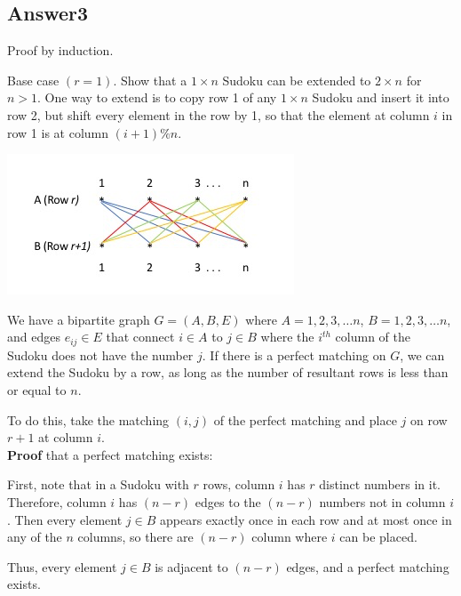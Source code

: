 \documentclass[twoside]{article}
\begin{document}
\subsection{Answer3}
Proof by induction.

Base case $(r=1)$. Show that a $1 \times n$ Sudoku can be extended to $2 \times n$ for $n > 1$.
One way to extend is to copy row 1 of any $1 \times n$ Sudoku and insert it into row 2, but shift every element in the row by 1, so that the element at column $i$ in row 1 is at column $(i + 1) \% n$. 

\includegraphics{SudokuFigure1}
 
We have a bipartite graph $G=(A, B, E)$ where $A={1, 2 , 3, \ldots n}$, $B={1, 2, 3, \ldots n}$, and edges $e_{ij} \in E$ that connect $i \in A$ to $j \in B$ where the $i^{th}$ column of the Sudoku does not have the number $j$. If there is a perfect matching on $G$, we can extend the Sudoku by a row, as long as the number of resultant rows is less than or equal to $n$. 

To do this, take the matching $(i,j)$ of the perfect matching and place $j$ on row $r+1$ at column $i$.\\[12pt]

\textbf{Proof} that a perfect matching exists:

First, note that in a Sudoku with $r$ rows, column $i$ has $r$ distinct numbers in it. Therefore, column $i$ has $(n - r)$ edges to the $(n - r)$ numbers not in column $i$. Then every element $j \in B$ appears exactly once in each row and at most once in any of the $n$ columns, so there are $(n - r)$ column where $i$ can be placed. 

Thus, every element $j \in B$ is adjacent to $(n - r)$ edges, and a perfect matching exists.
\end{document}
